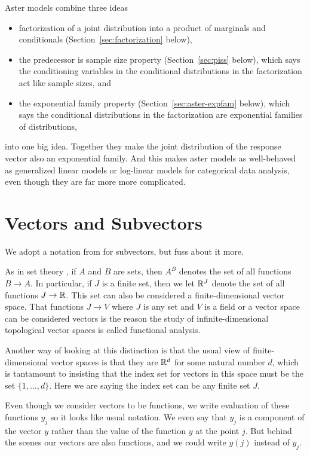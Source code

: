 Aster models combine three ideas
\begin{itemize}
\item factorization of a joint distribution into a product of marginals
    and conditionals (Section~\ref{sec:factorization} below),
\item the predecessor is sample size property (Section~\ref{sec:piss} below),
    which says the conditioning variables in the conditional distributions
    in the factorization act like sample sizes, and
\item the exponential family property (Section~\ref{sec:aster-expfam} below),
    which says the conditional distributions in the factorization are
    exponential families of distributions,
\end{itemize}
into one big idea.  Together they make the joint distribution of the
response vector also an exponential family.  And this makes aster models
as well-behaved as generalized linear models or log-linear models for
categorical data analysis, even though they are far more more complicated.

\section{Vectors and Subvectors}
\label{sec:subvector}

We adopt a notation from \citet{lauritzen} for subvectors, but fuss about it
more.

As in set theory \citep[Section~8]{halmos-set-theory}, if $A$ and $B$
are sets, then $A^B$ denotes the set of all functions $B \to A$.
In particular, if $J$ is a finite set, then we let $\mathbb{R}^J$ denote
the set of all functions $J \to \mathbb{R}$.  This set can also be considered
a finite-dimensional vector space.  That functions $J \to V$ where $J$ is
any set and $V$ is a field or a vector space can be considered
vectors is the reason the study of infinite-dimensional topological vector
spaces is called functional analysis.

Another way of looking at this distinction is that the usual view of
finite-dimensional vector spaces is that they are $\mathbb{R}^d$ for some
natural number $d$, which is tantamount to insisting that the index
set for vectors in this space must be the set $\{1, \ldots, d\}$.
Here we are saying the index set can be any finite set $J$.

Even though we consider vectors to be functions, we write evaluation
of these functions $y_j$ so it looks like usual notation.  We even say
that $y_j$ is a component of the vector $y$ rather than the value of
the function $y$ at the point $j$.  But behind the scenes our vectors
are also functions, and we could write $y(j)$ instead of $y_j$.

